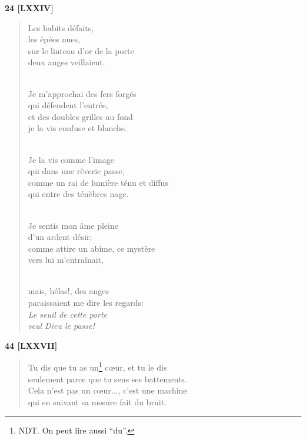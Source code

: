\documentclass[a4paper,12pt]{book}
\begin{document}
\bigskip

\begin{center} {\bf 24 [LXXIV]} \end{center}

\begin{verse}
Les habits défaits, \\
les épées nues, \\
sur le linteau d'or de la porte \\
deux anges veillaient. \\ \

Je m'approchai des fers forgés \\
qui défendent l'entrée, \\
et des doubles grilles au fond \\
je la vis confuse et blanche. \\ \

Je la vis comme l'image \\
qui dans une rêverie passe, \\
comme un rai de lumière ténu et diffus \\
qui entre des ténèbres nage. \\ \

Je sentis mon âme pleine \\
d'un ardent désir; \\
comme attire un abîme, ce mystère \\
vers lui m'entraînait, \\ \

mais, hélas!, des anges \\
paraissaient me dire les regards: \\
{\em Le seuil de cette porte \\
seul Dieu le passe!} \\
\end{verse}

\bigskip

\begin{center} {\bf 44 [LXXVII]} \end{center}

\begin{verse}
Tu dis que tu as un\footnote{NDT. On peut lire aussi ``du''.} c{\oe}ur, et tu le dis \\
seulement parce que tu sens ses battements. \\
Cela n'est pas un c{\oe}ur..., c'est une machine \\
qui en suivant sa mesure fait du bruit. \\
\end{verse}
\end{document}
